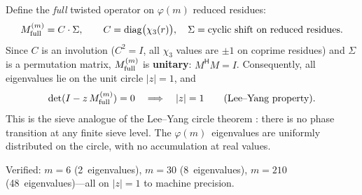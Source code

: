 \documentclass[12pt,a4paper]{article}
\begin{document}
\begin{remark}\mBR
\label{rem:lee_yang}
Define the \emph{full} twisted operator on $\varphi(m)$ reduced residues:
\[
  M_{\rm full}^{(m)} = C \cdot \Sigma,
  \qquad
  C = \operatorname{diag}\bigl(\chi_3(r)\bigr),
  \quad
  \Sigma = \text{cyclic shift on reduced residues}.
\]
Since $C$ is an involution ($C^2 = I$, all $\chi_3$ values are
$\pm 1$ on coprime residues) and $\Sigma$ is a permutation matrix,
$M_{\rm full}^{(m)}$ is \textbf{unitary}: $M^{\mathsf{H}} M = I$.
Consequently, all eigenvalues lie on the unit circle $|z| = 1$,
and
\[
  \det(I - z\,M_{\rm full}^{(m)}) = 0
  \quad \Longrightarrow \quad |z| = 1
  \qquad \text{(Lee--Yang property)}.
\]
This is the sieve analogue of the Lee--Yang circle theorem
\cite{LeeYang1952}: there is no phase transition at any finite
sieve level.  The $\varphi(m)$~eigenvalues are uniformly distributed
on the circle, with no accumulation at real values.

Verified: $m = 6$ (2~eigenvalues), $m = 30$ (8~eigenvalues),
$m = 210$ (48~eigenvalues)---all on $|z| = 1$ to machine precision.
\end{remark}
\end{document}
